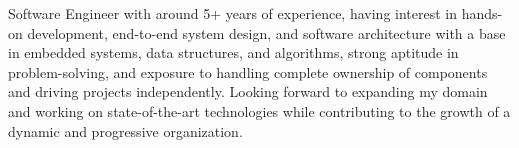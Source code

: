 
\begin{cvparagraph}
Software Engineer with around 5+ years of experience, having interest in hands-on development, end-to-end system design, and software architecture with a base in embedded systems, data structures, and algorithms, strong aptitude in problem-solving, and exposure to handling complete ownership of components and driving projects independently. Looking forward to expanding my domain and working on state-of-the-art technologies while contributing to the growth of a dynamic and progressive organization.
\end{cvparagraph}
